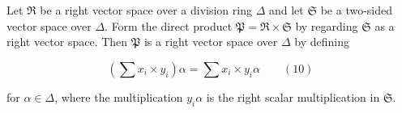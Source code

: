 Let $\mathfrak{R}$ be a right vector space over a division ring $\Delta$ and let $\mathfrak{S}$ be a two-sided vector space over $\Delta$. Form the direct product $\mathfrak{P} = \mathfrak{R} \times \mathfrak{S}$ by regarding $\mathfrak{S}$ as a right vector space. Then $\mathfrak{P}$ is a right vector space over $\Delta$ by defining

$$\left(\sum x_i \times y_i\right) \alpha = \sum x_i \times y_i \alpha \qquad (10)$$

for $\alpha \in \Delta$, where the multiplication $y_i \alpha$ is the right scalar multiplication in $\mathfrak{S}$.
